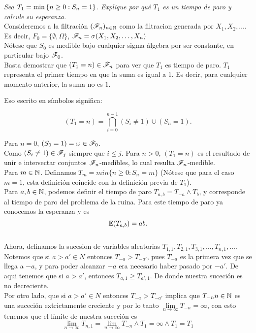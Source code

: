 \emph
{
	Sea $T_1=\min\left\{ n\geq 0:S_n=1\right\} $. Explique por qu\'e $T_1$ es un 
	tiempo de paro y calcule su esperanza.\\
}
\afterstatement
	Consideremos a la filtración $(\mathscr{F}_n)_{n\in\mathbb{N}}$ como la filtracion 
	generada por $X_1, X_2, \dots$.\\

	Es decir, $F_0 = \{\emptyset, \Omega\}$, $\mathscr{F}_n = \sigma(X_1, X_2, \dots, X_n)$\\

	Nótese que $S_0$ es medible bajo cualquier sigma álgebra por ser constante, en particular bajo
	$\mathscr{F}_0$.\\

	Basta demostrar que $(T_1 = n) \in \mathscr{F}_n$ para ver que $T_1$ es tiempo de paro. $T_1$ 
	representa el primer tiempo en que la suma es igual a $1$. Es decir, para cualquier 
	momento anterior, la suma no es $1$.

	Eso escrito en símbolos significa:

	$$(T_1 = n) = \bigcap_{i=0}^{n-1}(S_i \not= 1) \cup (S_n = 1).$$ 

	Para $n=0$, $(S_0 = 1) = \omega \in \mathscr{F}_0$. \\

	Como $(S_i \not= 1) \in \mathscr{F}_j$ siempre que $i \leq j$. Para $n>0$, $(T_1 = n)$ es el resultado de 
	unir e intersectar conjuntos $\mathscr{F}_n$-medibles, lo cual resulta $\mathscr{F}_n$-medible.\\

	Para $m \in \mathbb{N}$. Definamos $T_m = min\{n \geq 0 : S_n = m\}$ 
	(Nótese que para el caso $m=1$, esta definición	coincide con la definición previa de $T_1$).\\
	
	Para $a,b \in \mathbb{N}$, podemos definir el tiempo de paro $T_{a,b} = T_{-a} \wedge T_b$, y 
	corresponde al 	tiempo de paro del problema de la ruina. Para este tiempo de paro ya conocemos 
	la esperanza y es
	$$\mathbb{E}(T_{a,b}) = ab.$$\\
	
	Ahora, definamos la sucesion de variables aleatorias $T_{1,1}, T_{2,1}, T_{3,1}, \dots, T_{n,1}, 
	\dots$. Notemos que si $a>a' \in N$ entonces $T_{-a} > T_{-a'}$, pues $T_{-a}$ es la primera vez
	que se llega a $-a$, y para poder alcanzar $-a$ era necesario haber pasado por $-a'$.
	De aqui tenemos que si $a>a'$, entonces $T_{a,1} \geq T_{a',1}$. De donde nuestra suceción es 
	no decreciente.\\
	
	Por otro lado, que si $a>a' \in N$ entonces $T_{-a} > T_{-a'}$ implica que $T_{-n} n \in \mathbb{N}$ es 
	una suceción extrictamente creciente y por lo tanto 
	$\lim\limits_{n \rightarrow \infty} T_{-n} = \infty$, con esto tenemos que el límite de nuestra 
	suceción es 
	$$		
	\lim_{n\rightarrow\infty} T_{n,1} = 
	\lim_{n\rightarrow\infty} T_{-n} \wedge T_1 = 
	\infty \wedge T_1 = 
	T_1
	$$


